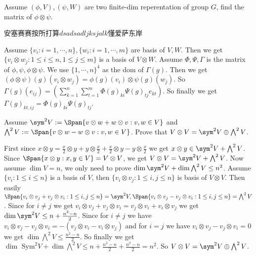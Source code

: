 \documentclass{ctexart}
\newif\ifpreface
\begin{document}
\large
\setlength{\baselineskip}{1.2em}
\ifpreface
	
	\newgeometry{left=2cm,right=2cm,top=2cm,bottom=2cm}
\else
	\maketitle
\fi
\begin{problem}
Assume \((\phi,V),(\psi,W)\) are two finite-dim reperentation of group \(G\), find the matrix of \(\phi \otimes \psi\).
\end{problem}

安塞赛赛按所打算\(dsadsadljksjalk\)懂爱萨东岸\(\)\(\)\(\)\(\)
\begin{solution}
	Assume \(\{ v_i:i=1,\cdots,n\},\{ w_i:i=1,\cdots ,m\}\) are basis of \(V,W\). Then we get \(\{ v_i \otimes w_j:1 \leq i \leq n,1 \leq j \leq m\}\) is a basis of \(V \otimes W\).
	Assume \(\Phi,\Psi,\Gamma\) is the matrix of \(\phi,\psi,\phi \otimes \psi\).
  We use \(\{ 1,\cdots,n\}^4\) as the dom of \(\Gamma( g)\). 
	Then we get \(( \phi \otimes \psi)( g)( v_i \otimes w_j)=\phi( g)( v_i)\otimes \psi( g)( w_j)\).
	So \(\Gamma( g)( e_{ij})=( \sum_{k=1}^{n}\sum_{t=1}^{m} \Phi( g)_{ki} \Psi( g)_{tj} e_{kt})\).
	So finally we get \(\Gamma( g)_{k t,i j}=\Phi( g)_{ki}\Psi( g)_{tj}\).
\end{solution}

\begin{problem}
Assume \(\sym^2 V:=\Span\{ v \otimes w + w \otimes v:v,w \in V\}\) and \(\bigwedge^2 V:=\Span\{ v \otimes w - w \otimes v:v,w \in V\}\).
Prove that \(V \otimes V = \sym^2 V \oplus \bigwedge^2 V\).
\end{problem}

\begin{solution}
	First since \(x \otimes y = \frac{x}{2} \otimes y + y \otimes \frac{x}{2} + \frac{x}{2}\otimes y - y \otimes \frac{x}{2}\) we get 
  \(x \otimes y \in \sym^2 V+ \bigwedge^2 V\). Since \(\Span\{ x \otimes y:x,y \in V\}=V \otimes V\), we get
  \(V \otimes V = \sym^2 V + \bigwedge^2 V\).
	Now assume \(\dim V=n\), we only need to prove \(\dim\sym^2 V + \dim \bigwedge^2 V \leq n^2\).
	Assume \(\{ v_i:1 \leq i \leq n\}\) is a basis of \(V\), then \(\{v_i \otimes v_j:1 \leq i,j \leq n\}\) is basis of \(V \otimes V\).
	Then easily \(\Span\{ v_i \otimes v_j + v_j \otimes v_i:1 \leq i,j \leq n\}=\sym^2 V,\Span\{ v_i \otimes v_j - v_j \otimes v_i : 1 \leq i,j \leq n\}=\bigwedge^2 V\).
	Since for \(i \neq j\) we get \(v_i \otimes v_j+v_j \otimes v_i=v_j \otimes v_i + v_i \otimes v_j\) we get \(\dim \sym^2 V \leq n+\frac{n^2-n}{2}\).
	Since for \(i \neq j\) we have \(v_i \otimes v_j - v_j \otimes v_i = -( v_j \otimes v_i - v_i \otimes v_j)\) and for \(i = j \) we have \(v_i \otimes v_j - v_j \otimes v_i=0\) we get \(\dim \bigwedge^2 V \leq \frac{n^2-n}{2}\).
	So finally we get \(\dim \text{ Sym}^2 V +\dim \bigwedge^2 V \leq n+\frac{n^2-n}{2}+\frac{n^2-n}{2}=n^2\).
	So \(V \otimes V=\sym^2 V \oplus \bigwedge^2 V\).
\end{solution}
\end{document}
